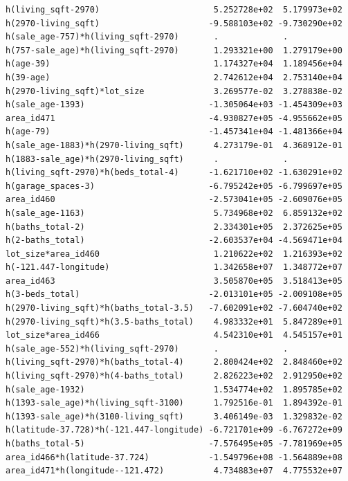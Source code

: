 \documentclass[
]{article}
\begin{document}
\begin{verbatim}
h(living_sqft-2970)                       5.252728e+02  5.179973e+02
h(2970-living_sqft)                      -9.588103e+02 -9.730290e+02
h(sale_age-757)*h(living_sqft-2970)       .             .           
h(757-sale_age)*h(living_sqft-2970)       1.293321e+00  1.279179e+00
h(age-39)                                 1.174327e+04  1.189456e+04
h(39-age)                                 2.742612e+04  2.753140e+04
h(2970-living_sqft)*lot_size              3.269577e-02  3.278838e-02
h(sale_age-1393)                         -1.305064e+03 -1.454309e+03
area_id471                               -4.930827e+05 -4.955662e+05
h(age-79)                                -1.457341e+04 -1.481366e+04
h(sale_age-1883)*h(2970-living_sqft)      4.273179e-01  4.368912e-01
h(1883-sale_age)*h(2970-living_sqft)      .             .           
h(living_sqft-2970)*h(beds_total-4)      -1.621710e+02 -1.630291e+02
h(garage_spaces-3)                       -6.795242e+05 -6.799697e+05
area_id460                               -2.573041e+05 -2.609076e+05
h(sale_age-1163)                          5.734968e+02  6.859132e+02
h(baths_total-2)                          2.334301e+05  2.372625e+05
h(2-baths_total)                         -2.603537e+04 -4.569471e+04
lot_size*area_id460                       1.210622e+02  1.216393e+02
h(-121.447-longitude)                     1.342658e+07  1.348772e+07
area_id463                                3.505870e+05  3.518413e+05
h(3-beds_total)                          -2.013101e+05 -2.009108e+05
h(2970-living_sqft)*h(baths_total-3.5)   -7.602091e+02 -7.604740e+02
h(2970-living_sqft)*h(3.5-baths_total)    4.983332e+01  5.847289e+01
lot_size*area_id466                       4.542310e+01  4.545157e+01
h(sale_age-552)*h(living_sqft-2970)       .             .           
h(living_sqft-2970)*h(baths_total-4)      2.800424e+02  2.848460e+02
h(living_sqft-2970)*h(4-baths_total)      2.826223e+02  2.912950e+02
h(sale_age-1932)                          1.534774e+02  1.895785e+02
h(1393-sale_age)*h(living_sqft-3100)      1.792516e-01  1.894392e-01
h(1393-sale_age)*h(3100-living_sqft)      3.406149e-03  1.329832e-02
h(latitude-37.728)*h(-121.447-longitude) -6.721701e+09 -6.767272e+09
h(baths_total-5)                         -7.576495e+05 -7.781969e+05
area_id466*h(latitude-37.724)            -1.549796e+08 -1.564889e+08
area_id471*h(longitude--121.472)          4.734883e+07  4.775532e+07
                                                                    

\end{verbatim}
\end{document}
